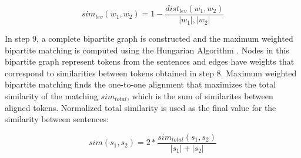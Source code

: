 \begin{equation}
sim_{lev}(w_1, w_2) = 1 - \frac{dist_{lev}(w_1, w_2)}{|w_1|, |w_2|}
\end{equation}

In step 9, a complete bipartite graph is constructed and the maximum weighted bipartite matching is computed using the Hungarian Algorithm \cite{Kuhn1955}. Nodes in this bipartite graph represent tokens from the sentences and edges have weights that correspond to similarities between tokens obtained in step 8.  Maximum weighted bipartite matching finds the one-to-one alignment that maximizes the total similarity of the matching  $sim_{total}$, which is the sum of similarites between aligned tokens. Normalized total similarity is used as the final value for the similarity between sentences:

\begin{equation}
sim(s_1, s_2) = 2 * \frac{sim_{total}(s_1, s_2)}{|s_1| + |s_2|}
\end{equation}